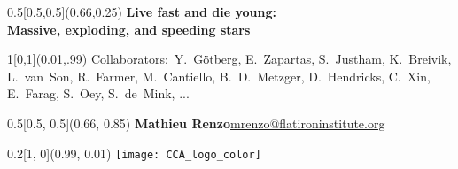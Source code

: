 \documentclass[xcolor=dvipsnames,professionalfonts, aspectratio=169]{beamer}
\begin{document}
\bgroup
{}
\begin{frame}[plain]
  \begin{textblock}{0.5}[0.5,0.5](0.66,0.25)
    \centering
    \textbf{\textcolor{white!80!Yellow}{{\Large Live fast and die
          young:\\}
        Massive, exploding, and speeding stars}}
  \end{textblock}

  \begin{textblock}{1}[0,1](0.01,.99)%
    \textcolor{white!80!Yellow}{\tiny
      Collaborators:~Y.~G\"otberg, E.~Zapartas, S.~Justham,
      K.~Breivik, L.~van~Son, R.~Farmer, M.~Cantiello,
      B.~D.~Metzger, D.~Hendricks,
      C.~Xin, E.~Farag, S.~Oey, S.~de~Mink, ...}
  \end{textblock}

  \begin{textblock}{0.5}[0.5, 0.5](0.66, 0.85)
    \centering
    \textcolor{white!80!Yellow}{\textbf{\large Mathieu
        Renzo}}\linebreak  \textcolor{whiteish}{\footnotesize\href{mailto:mrenzo@flatironinstitute.org}{mrenzo@flatironinstitute.org}}
  \end{textblock}

  \begin{textblock}{0.2}[1, 0](0.99, 0.01)
    \texttt{[image: CCA\_logo\_color]}
  \end{textblock}
\end{frame}
\egroup

\bgroup
{}
\begin{frame}[plain]

\end{frame}
\egroup
\end{document}
